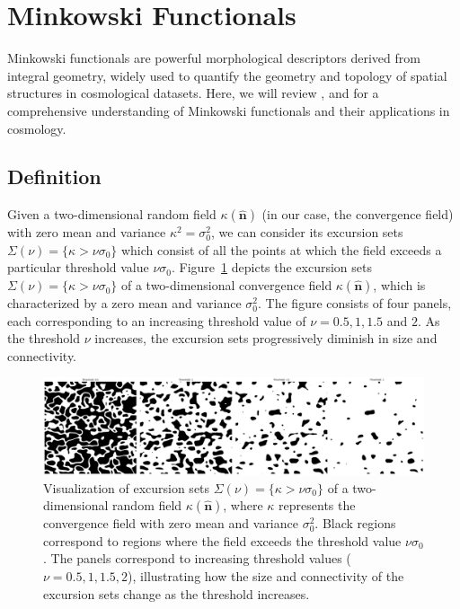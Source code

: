 \section{Minkowski Functionals}
\label{sec:minkowski_functionals}
Minkowski functionals are powerful morphological descriptors derived from integral geometry, widely used to quantify the geometry and topology of spatial structures in cosmological datasets. 
Here, we will review \citet{2010PhRvD..81h3505M}, \citet{2012PhRvD..85j3513K} and \citet{2013PhRvD..88l3002P} for a comprehensive understanding of Minkowski functionals and their applications in cosmology.

\subsection{Definition}
Given a two-dimensional random field $\kappa(\hat{\mathbf{n}})$ (in our case, the convergence field) with zero mean and variance $\kappa^2 = \sigma_0^2$, we can consider its excursion sets $\Sigma(\nu) = \{ \kappa > \nu \sigma_0 \}$ which consist of all the points at which the field exceeds a particular threshold value $\nu \sigma_0$. 
Figure~\ref{fig:excursion_sets} depicts the excursion sets $\Sigma(\nu) = \{ \kappa > \nu \sigma_0 \}$ of a two-dimensional convergence field $\kappa(\hat{\mathbf{n}})$, which is characterized by a zero mean and variance $\sigma_0^2$. The figure consists of four panels, each corresponding to an increasing threshold value of $\nu = 0.5, 1, 1.5$ and $2$. As the threshold $\nu$ increases, the excursion sets progressively diminish in size and connectivity. 
\begin{figure}[ht]
    \centering
    \includegraphics[width=\textwidth]{figures/threshold_comparison.png}
    \caption{Visualization of excursion sets $\Sigma(\nu) = \{ \kappa > \nu \sigma_0 \}$ of a two-dimensional random field $\kappa(\hat{\mathbf{n}})$, where $\kappa$ represents the convergence field with zero mean and variance $\sigma_0^2$. 
    Black regions correspond to regions where the field exceeds the threshold value $\nu \sigma_0$. The panels correspond to increasing threshold values ($\nu = 0.5, 1, 1.5, 2$), illustrating how the size and connectivity of the excursion sets change as the threshold increases.}
    \label{fig:excursion_sets}
\end{figure}
